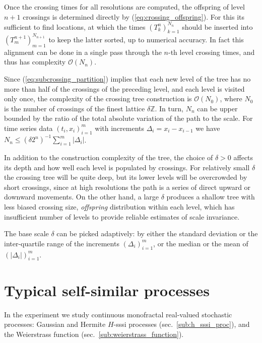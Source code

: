 \documentclass[a4paper]{article}
\begin{document}
Once the crossing times for all resolutions are computed, the offspring of level
$n+1$ crossings is determined directly by (\ref{eq:crossing_offspring}). For this
its sufficient to find locations, at which the times $(T_k^n)_{k=1}^{N_n}$ should
be inserted into $(T_m^{n+1})_{m=1}^{N_{n+1}}$ to keep the latter sorted, up to
numerical accuracy. In fact this alignment can be done in a single pass through
the $n$-th level crossing times, and thus has complexity $\mathcal{O}(N_n)$.

Since (\ref{eq:subcrossing_partition}) implies that each new level of the tree has
no more than half of the crossings of the preceding level, and each level is visited
only once, the complexity of the crossing tree construction is $\mathcal{O}(N_0)$,
where $N_0$ is the number of crossings of the finest lattice $\delta \mathbb{Z}$.
In turn, $N_n$ can be upper bounded by the ratio of the total absolute variation
of the path to the scale. For time series data $(t_i, x_i)_{i=1}^m$ with increments
$\Delta_i = x_i - x_{i-1}$ we have $N_n \leq (\delta 2^n)^{-1} \sum_{i=1}^m |\Delta_i|$.

In addition to the construction complexity of the tree, the choice of $\delta > 0$
affects its depth and how well each level is populated by crossings. For relatively
small $\delta$ the crossing tree will be quite deep, but its lower levels will be
overcrowded by short crossings, since at high resolutions the path is a series of
direct upward or downward movements. On the other hand, a large $\delta$ produces
a shallow tree with less biased crossing size, \emph{offspring} distribution within
each level, which has insufficient number of levels to provide reliable estimates
of scale invariance.

The base scale $\delta$ can be picked adaptively: by either the standard deviation
or the inter-quartile range of the increments $(\Delta_i)_{i=1}^m$, or the median
or the mean of $(|\Delta_i|)_{i=1}^m$.



\section{Typical self-similar processes} %
\label{sec:self_sim_processes}

In the experiment we study continuous monofractal real-valued stochastic processes:
Gaussian and Hermite $H$-sssi processes (sec.~\ref{sub:h_sssi_proc}), and the Weierstrass
function (sec.~\ref{sub:weierstrass_function}).
\end{document}
